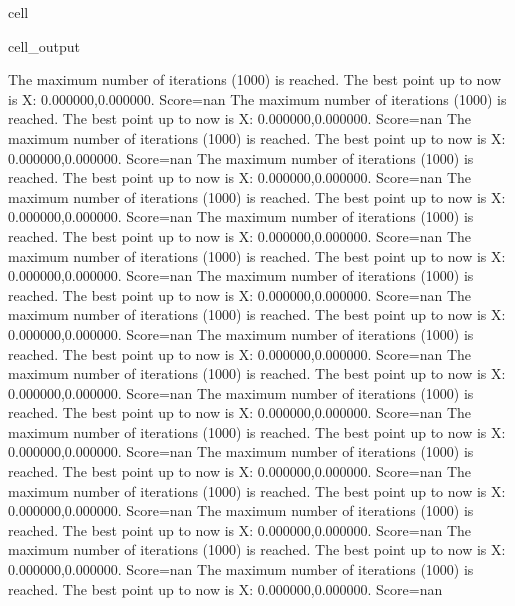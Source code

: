 \documentclass[letterpaper,10pt,english]{jupyterBook}
\begin{document}
\begin{sphinxuseclass}{cell}
\begin{sphinxVerbatimOutput}
\begin{sphinxuseclass}{cell_output}
\begin{sphinxVerbatim}[commandchars=\\\{\}]
The maximum number of iterations (1000) is reached. The best point up to now is X: \PYGZob{}0.000000,0.000000\PYGZcb{}. Score=\PYGZhy{}nan
The maximum number of iterations (1000) is reached. The best point up to now is X: \PYGZob{}0.000000,0.000000\PYGZcb{}. Score=\PYGZhy{}nan
The maximum number of iterations (1000) is reached. The best point up to now is X: \PYGZob{}0.000000,0.000000\PYGZcb{}. Score=\PYGZhy{}nan
The maximum number of iterations (1000) is reached. The best point up to now is X: \PYGZob{}0.000000,0.000000\PYGZcb{}. Score=\PYGZhy{}nan
The maximum number of iterations (1000) is reached. The best point up to now is X: \PYGZob{}0.000000,0.000000\PYGZcb{}. Score=\PYGZhy{}nan
The maximum number of iterations (1000) is reached. The best point up to now is X: \PYGZob{}0.000000,0.000000\PYGZcb{}. Score=\PYGZhy{}nan
The maximum number of iterations (1000) is reached. The best point up to now is X: \PYGZob{}0.000000,0.000000\PYGZcb{}. Score=\PYGZhy{}nan
The maximum number of iterations (1000) is reached. The best point up to now is X: \PYGZob{}0.000000,0.000000\PYGZcb{}. Score=\PYGZhy{}nan
The maximum number of iterations (1000) is reached. The best point up to now is X: \PYGZob{}0.000000,0.000000\PYGZcb{}. Score=\PYGZhy{}nan
The maximum number of iterations (1000) is reached. The best point up to now is X: \PYGZob{}0.000000,0.000000\PYGZcb{}. Score=\PYGZhy{}nan
The maximum number of iterations (1000) is reached. The best point up to now is X: \PYGZob{}0.000000,0.000000\PYGZcb{}. Score=\PYGZhy{}nan
The maximum number of iterations (1000) is reached. The best point up to now is X: \PYGZob{}0.000000,0.000000\PYGZcb{}. Score=\PYGZhy{}nan
The maximum number of iterations (1000) is reached. The best point up to now is X: \PYGZob{}0.000000,0.000000\PYGZcb{}. Score=\PYGZhy{}nan
The maximum number of iterations (1000) is reached. The best point up to now is X: \PYGZob{}0.000000,0.000000\PYGZcb{}. Score=\PYGZhy{}nan
The maximum number of iterations (1000) is reached. The best point up to now is X: \PYGZob{}0.000000,0.000000\PYGZcb{}. Score=\PYGZhy{}nan
The maximum number of iterations (1000) is reached. The best point up to now is X: \PYGZob{}0.000000,0.000000\PYGZcb{}. Score=\PYGZhy{}nan
The maximum number of iterations (1000) is reached. The best point up to now is X: \PYGZob{}0.000000,0.000000\PYGZcb{}. Score=\PYGZhy{}nan
The maximum number of iterations (1000) is reached. The best point up to now is X: \PYGZob{}0.000000,0.000000\PYGZcb{}. Score=\PYGZhy{}nan

\end{sphinxVerbatim}
\end{sphinxuseclass}
\end{sphinxVerbatimOutput}
\end{sphinxuseclass}
\end{document}
